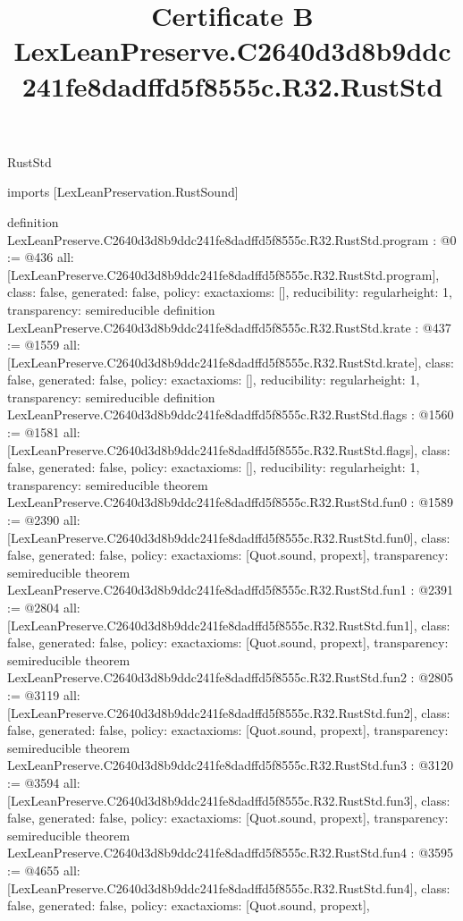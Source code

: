 \begin{lexlean}{RustStd}
\title{Certificate B LexLeanPreserve.C2640d3d8b9ddc241fe8dadffd5f8555c.R32.RustStd}
\begin{coremodule}
imports [LexLeanPreservation.RustSound]

definition LexLeanPreserve.C2640d3d8b9ddc241fe8dadffd5f8555c.R32.RustStd.program : @0 := @436 {
  all: [LexLeanPreserve.C2640d3d8b9ddc241fe8dadffd5f8555c.R32.RustStd.program],
  class: false,
  generated: false,
  policy: exact{axioms: []},
  reducibility: regular{height: 1},
  transparency: semireducible
}
definition LexLeanPreserve.C2640d3d8b9ddc241fe8dadffd5f8555c.R32.RustStd.krate : @437 := @1559 {
  all: [LexLeanPreserve.C2640d3d8b9ddc241fe8dadffd5f8555c.R32.RustStd.krate],
  class: false,
  generated: false,
  policy: exact{axioms: []},
  reducibility: regular{height: 1},
  transparency: semireducible
}
definition LexLeanPreserve.C2640d3d8b9ddc241fe8dadffd5f8555c.R32.RustStd.flags : @1560 := @1581 {
  all: [LexLeanPreserve.C2640d3d8b9ddc241fe8dadffd5f8555c.R32.RustStd.flags],
  class: false,
  generated: false,
  policy: exact{axioms: []},
  reducibility: regular{height: 1},
  transparency: semireducible
}
theorem LexLeanPreserve.C2640d3d8b9ddc241fe8dadffd5f8555c.R32.RustStd.fun0 : @1589 := @2390 {
  all: [LexLeanPreserve.C2640d3d8b9ddc241fe8dadffd5f8555c.R32.RustStd.fun0],
  class: false,
  generated: false,
  policy: exact{axioms: [Quot.sound, propext]},
  transparency: semireducible
}
theorem LexLeanPreserve.C2640d3d8b9ddc241fe8dadffd5f8555c.R32.RustStd.fun1 : @2391 := @2804 {
  all: [LexLeanPreserve.C2640d3d8b9ddc241fe8dadffd5f8555c.R32.RustStd.fun1],
  class: false,
  generated: false,
  policy: exact{axioms: [Quot.sound, propext]},
  transparency: semireducible
}
theorem LexLeanPreserve.C2640d3d8b9ddc241fe8dadffd5f8555c.R32.RustStd.fun2 : @2805 := @3119 {
  all: [LexLeanPreserve.C2640d3d8b9ddc241fe8dadffd5f8555c.R32.RustStd.fun2],
  class: false,
  generated: false,
  policy: exact{axioms: [Quot.sound, propext]},
  transparency: semireducible
}
theorem LexLeanPreserve.C2640d3d8b9ddc241fe8dadffd5f8555c.R32.RustStd.fun3 : @3120 := @3594 {
  all: [LexLeanPreserve.C2640d3d8b9ddc241fe8dadffd5f8555c.R32.RustStd.fun3],
  class: false,
  generated: false,
  policy: exact{axioms: [Quot.sound, propext]},
  transparency: semireducible
}
theorem LexLeanPreserve.C2640d3d8b9ddc241fe8dadffd5f8555c.R32.RustStd.fun4 : @3595 := @4655 {
  all: [LexLeanPreserve.C2640d3d8b9ddc241fe8dadffd5f8555c.R32.RustStd.fun4],
  class: false,
  generated: false,
  policy: exact{axioms: [Quot.sound, propext]},
}
\end{coremodule}
\end{lexlean}
